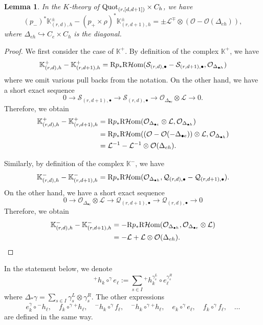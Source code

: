\documentclass[10pt]{amsart}
\newcommand{\BK}{\mathbb{K}}
\newcommand{\R}{\textnormal{R}}
\newcommand{\CO}{\mathcal{O}}
\newcommand{\CS}{\mathcal{S}}
\newcommand{\CQ}{\mathcal{Q}}
\newcommand{\CL}{\mathcal{L}}
\newcommand{\Quot}{\textnormal{Quot}}
\newcommand{\RHHom}{\textnormal{R}\mathcal{H}\textnormal{om}}
\newcommand{\+}{{}^+}
\newtheorem {lemma}[theorem]{Lemma}
\theoremstyle{definition}
\theoremstyle {definition}
\theoremstyle {definition}
\begin{document}
\begin{lemma}\label{lem: comparing K complex}
In the $K$-theory of $\Quot_{(r, [d,d+1])} \times C_h$, we have
$$(p_-)^*\BK^\pm_{(r,d),h}-(p_+\times\rho)^*\BK^\pm_{(r,d+1),h}=\pm \CL^{\mp}\otimes(\CO - \CO(\Delta_{eh})),
$$
where $\Delta_{eh}\hookrightarrow C_e\times C_h$ is the diagonal. 
\end{lemma}
\begin{proof}
We first consider the case of $\BK^+$. By definition of the complex $\BK^+$, we have
$$\BK^+_{(r,d),h}-\BK^+_{(r,d+1),h}=\R p_*\RHHom(\CS_{(r,d),\bullet} - \CS_{(r,d+1),\bullet}, \CO_{\Delta_{\bullet h}})
$$
where we omit various pull backs from the notation. On the other hand, we have a short exact sequence
$$0\rightarrow \CS_{(r,d+1),\bullet}\rightarrow \CS_{(r,d),\bullet}\rightarrow \CO_{\Delta_{\bullet e}}\otimes \CL\rightarrow 0.
$$
Therefore, we obtain 
\begin{align*}
\BK^+_{(r,d),h}-\BK^+_{(r,d+1),h}
&=\R p_* \RHHom(\CO_{\Delta_{\bullet e}}\otimes \CL,\CO_{\Delta_{\bullet h}})\\
&=\R p_* \RHHom((\CO-\CO(-\Delta_{\bullet e}))\otimes \CL,\CO_{\Delta_{\bullet h}})\\
&=\CL^{-1}-\CL^{-1}\otimes \CO(\Delta_{eh}).
\end{align*}

Similarly, by definition of the complex $\BK^-$, we have
$$\BK^-_{(r,d),h}-\BK^-_{(r,d+1),h}=\R p_*\RHHom(\CO_{\Delta_{\bullet h}},\CQ_{(r,d),\bullet} - \CQ_{(r,d+1),\bullet}).
$$
On the other hand, we have a short exact sequence
$$0\rightarrow \CO_{\Delta_{\bullet e}}\otimes \CL\rightarrow \CQ_{(r,d+1),\bullet}\rightarrow \CQ_{(r,d),\bullet}\rightarrow 0
$$
Therefore, we obtain 
\begin{align*}
\BK^-_{(r,d),h}-\BK^-_{(r,d+1),h}
&=-\R p_*\RHHom(\CO_{\Delta_{\bullet h}},\CO_{\Delta_{\bullet e}}\otimes \CL)\\
&=-\CL+\CL\otimes \CO(\Delta_{eh}).
\end{align*}
\end{proof}

In the statement below, we denote 
$${}^{+}h_k \circ^\gamma e_\ell:=\sum_{s\in I} {}^{+}h_k^{\gamma_s^L} \circ e_\ell^{\gamma_s^R}
$$
where $\Delta_*\gamma=\sum_{s\in I} \gamma_s^L\otimes \gamma_s^R$. The other expressions
$$e_k^\gamma\circ {}^{-}h_\ell,\quad f_k\circ^\gamma {}^{+}h_\ell,\quad {}^{-}h_k\circ^\gamma f_\ell,\quad {}^{-}h_k\circ^\gamma {}^{+}h_\ell,\quad e_k\circ^\gamma e_\ell,\quad f_k\circ^\gamma f_\ell,\quad \dots $$ 
are defined in the same way. 
\end{document}
